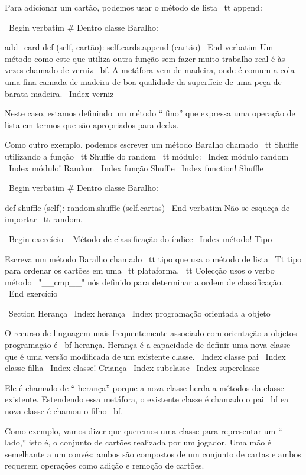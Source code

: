 \documentclass[10pt]{book}
\begin{document}
{{{{{{{{{{{{{{{{Para adicionar um cartão, podemos usar o método de lista {\ tt append}:

\ Begin {verbatim}
# Dentro classe Baralho:

    add_card def (self, cartão):
        self.cards.append (cartão)
\ End {verbatim}
%
Um método como este que utiliza outra função sem fazer
muito trabalho real é às vezes chamado de verniz {\ bf}. A metáfora
vem de madeira, onde é comum a cola uma fina
camada de madeira de boa qualidade da superfície de uma peça de barata
madeira.
\ Index {verniz}

Neste caso, estamos definindo um método `` fino'' que expressa
uma operação de lista em termos que são apropriados para decks.

Como outro exemplo, podemos escrever um método Baralho chamado {\ tt Shuffle}
utilizando a função {\ tt Shuffle} do {random \ tt} módulo:
\ Index {módulo random}
\ Index {módulo! Random}
\ Index {função Shuffle}
\ Index {function! Shuffle}

\ Begin {verbatim}
# Dentro classe Baralho:
            
    def shuffle (self):
        random.shuffle (self.cartas)
\ End {verbatim}
%
Não se esqueça de importar {\ tt random}.

\ Begin {} exercício
\ {} Método de classificação do índice
\ Index {método! Tipo}

Escreva um método Baralho chamado {\ tt} tipo que usa o método de lista
{\ Tt tipo} para ordenar os cartões em uma {\ tt plataforma}. {\ tt Colecção} usos
o verbo método \ "__cmp__" nós definido para determinar a ordem de classificação.
\ End {} exercício



\ Section {} Herança
\ Index {herança}
\ Index {programação orientada a objeto}

O recurso de linguagem mais frequentemente associado com orientação a objetos
programação é {\ bf herança}. Herança é a capacidade de
definir uma nova classe que é uma versão modificada de um existente
classe.
\ Index {classe pai}
\ Index {classe filha}
\ Index {classe! Criança}
\ Index {subclasse}
\ Index {superclasse}

Ele é chamado de `` herança'' porque a nova classe herda a
métodos da classe existente. Estendendo essa metáfora, o existente
classe é chamado o pai {\ bf} ea nova classe é
chamou o filho {\ bf}.

Como exemplo, vamos dizer que queremos uma classe para representar um `` lado,''
isto é, o conjunto de cartões realizada por um jogador. Uma mão é semelhante a um
convés: ambos são compostos de um conjunto de cartas e ambos requerem operações
como adição e remoção de cartões.

}}}}}}}}}}}}}}}}
\end{document}
